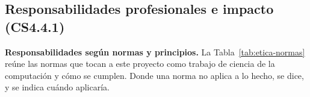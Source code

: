 
\subsection*{Responsabilidades profesionales e impacto (CS4.4.1)}

\noindent\textbf{Responsabilidades según normas y principios.} La
Tabla~\ref{tab:etica-normas} reúne las normas que tocan a este proyecto
como trabajo de ciencia de la computación y cómo se cumplen. Donde una
norma no aplica a lo hecho, se dice, y se indica cuándo aplicaría.

